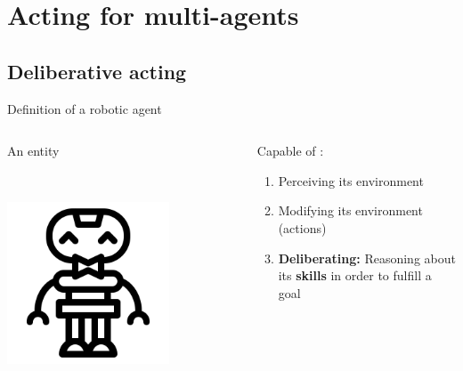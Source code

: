 \section{Acting for multi-agents}
\subsection{Deliberative acting}
\begin{frame}{Definition of a robotic agent}

    \begin{columns}[T]
        \begin{column}{0.3\textwidth}
            An entity

            ~

            \includegraphics[width = 0.7\textwidth]{images/icons8-robot-gustav-500.png}
        \end{column}
        \begin{column}{0.7\textwidth}
            \center Capable of :
            \pause
            \begin{enumerate}
                \item Perceiving its environment
                \pause
                \item Modifying its environment (actions)
                \pause
                \item \textbf{Deliberating:} Reasoning about its \textbf{skills} in order to fulfill a goal
            \end{enumerate}
        \end{column}
    \end{columns}

 
\end{frame}


